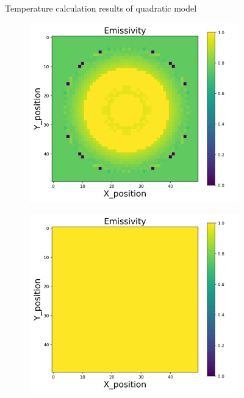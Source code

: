 {\begin{figure}[p]
\begin{minipage}{\textwidth}
\begin{subfigure}{0.325\textwidth}
        \end{subfigure}
    \end{minipage}
    \caption{Temperature calculation results of quadratic model}  
\end{figure}
\begin{figure}[p]
    \centering
    \begin{minipage}{\textwidth}
        \centering
        \begin{subfigure}{0.325\textwidth}
            \centering
            \includegraphics[width=\textwidth]{figures/raw_data/0/quad/emi_cal.jpg}
        \end{subfigure}
        \begin{subfigure}{0.325\textwidth}
            \centering
            \includegraphics[width=\textwidth]{figures/raw_data/5/quad/emi_cal.jpg}

\end{subfigure}
\end{minipage}
\end{figure}}
